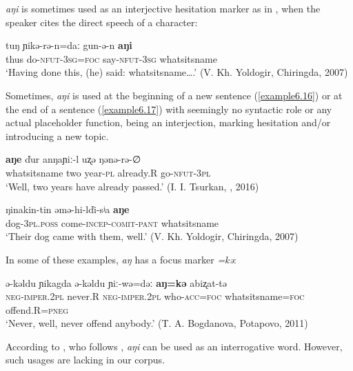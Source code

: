 \documentclass[output=paper,colorlinks,citecolor=brown]{langscibook}
\begin{document}
\textit{aŋi} is sometimes used as an interjective hesitation marker as in \citet{HayashiYoon2010}, when the speaker cites the direct speech of a character:

\ea
    \label{example6.15}
    \gll tuŋ 	ɲikə-rə-n=daː	gun-ə-n 	\textbf{aŋi}\\
    thus	do-\textsc{nfut}-3\textsc{sg}=\textsc{foc}	say-\textsc{nfut}-3\textsc{sg}	whatsitsname\\
    \glt `Having done this, (he) said: whatsitsname….' (V. Kh. Yoldogir, Chiringda, 2007)\\
    \z

Sometimes, \textit{aŋi} is used at the beginning of a new sentence (\ref{example6.16}) or at the end of a sentence (\ref{example6.17}) with seemingly no syntactic role or any actual placeholder function, being an interjection, marking hesitation and/or introducing a new topic.

\ea
    \label{example6.16}
    \gll \textbf{aŋe}	ďur	anŋaɲiː-l	uʐə	ŋənə-rə-∅\\
    whatsitsname	two	year-\textsc{pl}	already.R	go-\textsc{nfut}-3\textsc{pl}\\
    \glt `Well, two years have already passed.' (I. I. Tsurkan, , 2016)\\
    \z

\ea
    \label{example6.17}
    \gll ŋinakin-tin	əmə-hi-lďi-sʲa	\textbf{aŋe}\\
    dog-\textsc{3pl.poss}	come-\textsc{incep}-\textsc{comit}-\textsc{pant}	whatsitsname\\
    \glt `Their dog came with them, well.' (V. Kh. Yoldogir, Chiringda, 2007)\\
    \z

In some of these examples, \textit{aŋ} has a focus marker \textit{=kə}:

\ea
    \label{example6.18}
    \gll ə-kəldu	ɲikagda	ə-kəldu	ɲiː-wə=dəː	\textbf{aŋ=kə}   abiʐat-tə\\
    \textsc{neg-imper.2pl}	never.R	\textsc{neg-imper.2pl}	who-\textsc{acc=foc}	whatsitsname=\textsc{foc} offend.R=\textsc{pneg}\\
    \glt `Never, well, never offend anybody.' (T. A. Bogdanova, Potapovo, 2011)\\
    \z

According to \citet[300]{Idiatov2007}, who follows \citet[24]{BulatovaGrenoble1999}, \textit{aŋi} can be used as an interrogative word. However, such usages are lacking in our corpus.
\end{document}
